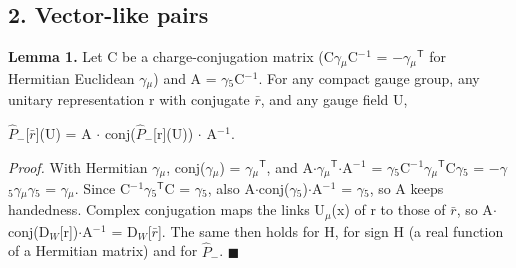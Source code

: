 \documentclass[
]{article}
\begin{document}
\hypertarget{vector-like-pairs}{%
\subsection{2. Vector-like pairs}\label{vector-like-pairs}}

\textbf{Lemma 1.} Let C be a charge-conjugation matrix (C\ensuremath{\gamma}\ensuremath{_{\ensuremath{\mu}}}C\ensuremath{^{-}}\ensuremath{^{1}} =
\ensuremath{-}\ensuremath{\gamma}\ensuremath{_{\ensuremath{\mu}}}\ensuremath{^{\mathsf{T}}} for Hermitian Euclidean \ensuremath{\gamma}\ensuremath{_{\ensuremath{\mu}}}) and A = \ensuremath{\gamma}\ensuremath{_{5}}C\ensuremath{^{-}}\ensuremath{^{1}}. For any compact
gauge group, any unitary representation r with conjugate \ensuremath{\bar{r}}, and any
gauge field U,

\ensuremath{\hat{P}}\ensuremath{_{-}}{[}\ensuremath{\bar{r}}{]}(U) = A \ensuremath{\cdot} conj(\ensuremath{\hat{P}}\ensuremath{_{-}}{[}r{]}(U)) \ensuremath{\cdot} A\ensuremath{^{-}}\ensuremath{^{1}}.

\emph{Proof.} With Hermitian \ensuremath{\gamma}\ensuremath{_{\ensuremath{\mu}}}, conj(\ensuremath{\gamma}\ensuremath{_{\ensuremath{\mu}}}) = \ensuremath{\gamma}\ensuremath{_{\ensuremath{\mu}}}\ensuremath{^{\mathsf{T}}}, and A\ensuremath{\cdot}\ensuremath{\gamma}\ensuremath{_{\ensuremath{\mu}}}\ensuremath{^{\mathsf{T}}}\ensuremath{\cdot}A\ensuremath{^{-}}\ensuremath{^{1}} =
\ensuremath{\gamma}\ensuremath{_{5}}C\ensuremath{^{-}}\ensuremath{^{1}}\ensuremath{\gamma}\ensuremath{_{\ensuremath{\mu}}}\ensuremath{^{\mathsf{T}}}C\ensuremath{\gamma}\ensuremath{_{5}} = \ensuremath{-}\ensuremath{\gamma}\ensuremath{_{5}}\ensuremath{\gamma}\ensuremath{_{\ensuremath{\mu}}}\ensuremath{\gamma}\ensuremath{_{5}} = \ensuremath{\gamma}\ensuremath{_{\ensuremath{\mu}}}. Since C\ensuremath{^{-}}\ensuremath{^{1}}\ensuremath{\gamma}\ensuremath{_{5}}\ensuremath{^{\mathsf{T}}}C = \ensuremath{\gamma}\ensuremath{_{5}}, also
A\ensuremath{\cdot}conj(\ensuremath{\gamma}\ensuremath{_{5}})\ensuremath{\cdot}A\ensuremath{^{-}}\ensuremath{^{1}} = \ensuremath{\gamma}\ensuremath{_{5}}, so A keeps handedness. Complex conjugation maps the
links U\ensuremath{_{\ensuremath{\mu}}}(x) of r to those of \ensuremath{\bar{r}}, so A\ensuremath{\cdot}conj(D\ensuremath{_{W}}{[}r{]})\ensuremath{\cdot}A\ensuremath{^{-}}\ensuremath{^{1}} =
D\ensuremath{_{W}}{[}\ensuremath{\bar{r}}{]}. The same then holds for H, for sign H (a real function of a
Hermitian matrix) and for \ensuremath{\hat{P}}\ensuremath{_{-}}. \ensuremath{\blacksquare}
\end{document}
